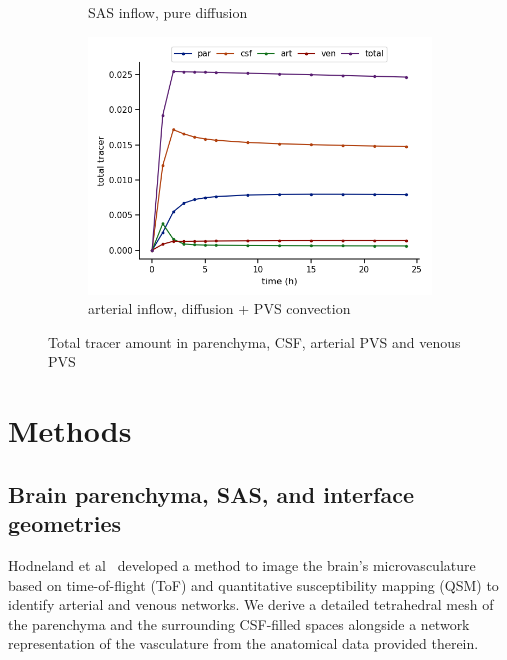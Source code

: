 \documentclass[fleqn,10pt]{wlscirep}
\newcommand{\mer}[1]{\textcolor{magenta}{#1}}
\begin{document}
\begin{figure}
\begin{subfigure}[b]{0.33\textwidth}
         \caption{SAS inflow, pure diffusion}
         \label{fig:three sin x}
     \end{subfigure}
     \hfill
     \begin{subfigure}[b]{0.33\textwidth}
         \centering
         \includegraphics[width=\textwidth]{modelC_total_conc.png}
         \caption{arterial inflow, diffusion + PVS convection}
         \label{fig:five over x}
     \end{subfigure}
        \caption{Total tracer amount in parenchyma, CSF, arterial PVS and venous PVS}
        \label{fig:three graphs}
\end{figure}

\fi

\newpage
\section*{Methods}


\subsection*{Brain parenchyma, SAS, and interface geometries}


Hodneland et al~\cite{hodneland2019new} developed a method to image
the brain's microvasculature based on time-of-flight (ToF) and
quantitative susceptibility mapping (QSM) to identify arterial and
venous networks.  We derive a detailed tetrahedral mesh of the
parenchyma and the surrounding CSF-filled spaces alongside a network
representation of the vasculature from the anatomical data provided
therein. 
\end{document}
